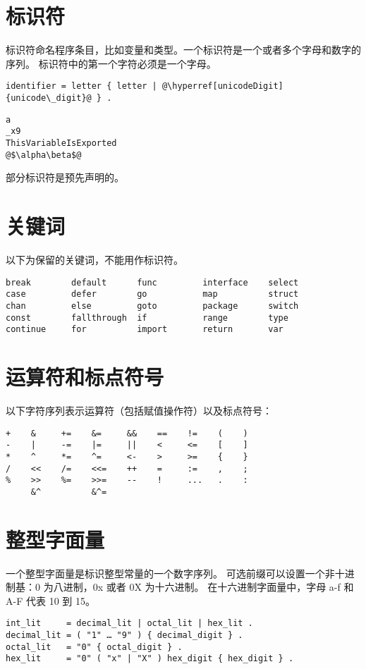 \section{标识符}
标识符命名程序条目，比如变量和类型。一个标识符是一个或者多个字母和数字的序列。
标识符中的第一个字符必须是一个字母。
\begin{lstlisting}[style=EBNF]
identifier = letter { letter | @\hyperref[unicodeDigit]{unicode\_digit}@ } .
\end{lstlisting}

\begin{lstlisting}[style=golang]
a
_x9
ThisVariableIsExported
@$\alpha\beta$@
\end{lstlisting}
部分标识符是预先声明的。

\section{关键词}
以下为保留的关键词，不能用作标识符。
\begin{lstlisting}[style=golang]
break        default      func         interface    select
case         defer        go           map          struct
chan         else         goto         package      switch
const        fallthrough  if           range        type
continue     for          import       return       var
\end{lstlisting}

\section{运算符和标点符号}
以下字符序列表示运算符（包括赋值操作符）以及标点符号：
\begin{lstlisting}[style=golang]
+    &     +=    &=     &&    ==    !=    (    )
-    |     -=    |=     ||    <     <=    [    ]
*    ^     *=    ^=     <-    >     >=    {    }
/    <<    /=    <<=    ++    =     :=    ,    ;
%    >>    %=    >>=    --    !     ...   .    :
     &^          &^=
\end{lstlisting}

\section{整型字面量}
一个整型字面量是标识整型常量的一个数字序列。
可选前缀可以设置一个非十进制基：0 为八进制，0x 或者 0X 为十六进制。
在十六进制字面量中，字母 a-f 和 A-F 代表 10 到 15。
\begin{lstlisting}[style=EBNF]
int_lit     = decimal_lit | octal_lit | hex_lit .
decimal_lit = ( "1" … "9" ) { decimal_digit } .
octal_lit   = "0" { octal_digit } .
hex_lit     = "0" ( "x" | "X" ) hex_digit { hex_digit } .
\end{lstlisting}

